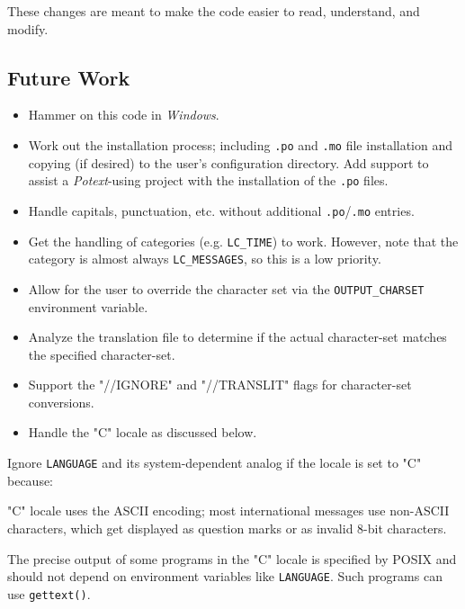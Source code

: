 \documentclass[
 11pt,
 twoside,
 a4paper,
 final                                 %
]{article}
\begin{document}
   These changes are meant to make the code easier to read, understand,
   and modify.

\subsection{Future Work}
\label{subsec:introduction_future}

   \begin{itemize}
      \item Hammer on this code in \textsl{Windows}.
      \item Work out the installation process; including \texttt{.po}
         and \texttt{.mo} file
         installation and copying (if desired)
         to the user's configuration directory.
         Add support to assist a \textsl{Potext}-using project with the
         installation of the \texttt{.po} files.
      \item Handle capitals, punctuation, etc. without additional
         \texttt{.po}/\texttt{.mo} entries.
      \item Get the handling of categories (e.g. \texttt{LC\_TIME}) to
         work. However, note that the category is almost always
         \texttt{LC\_MESSAGES}, so this is a low priority.
      \item Allow for the user to override the character set via the
         \texttt{OUTPUT\_CHARSET} environment variable.
      \item Analyze the translation file to determine if the
         actual character-set matches the specified character-set.
      \item Support the "//IGNORE" and "//TRANSLIT" flags for character-set
         conversions.
      \item Handle the "C" locale as discussed below.
   \end{itemize}

   Ignore \texttt{LANGUAGE} and its system-dependent analog if the locale is
   set to "C" because:

   \begin{enumber}
      \item "C" locale uses the ASCII encoding; most international
         messages use non-ASCII characters, which get displayed
         as question marks or as invalid 8-bit characters.
      \item The precise output of some programs in the "C" locale
         is specified by POSIX and should not depend on environment
         variables like \texttt{LANGUAGE}.  Such programs can use
         \texttt{gettext()}.
   \end{enumber}
\end{document}
